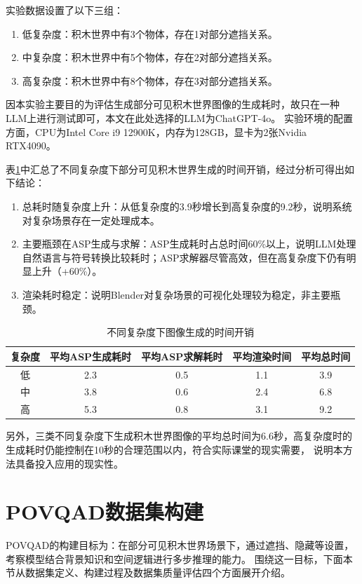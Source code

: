实验数据设置了以下三组：
\begin{enumerate}[nosep]
\item 低复杂度：积木世界中有3个物体，存在1对部分遮挡关系。
\item 中复杂度：积木世界中有5个物体，存在2对部分遮挡关系。
\item 高复杂度：积木世界中有8个物体，存在3对部分遮挡关系。
\end{enumerate}

因本实验主要目的为评估生成部分可见积木世界图像的生成耗时，故只在一种LLM上进行测试即可，本文在此处选择的LLM为ChatGPT-4o。
实验环境的配置方面，CPU为Intel Core i9 12900K，内存为128GB，显卡为2张Nvidia RTX4090。

表\ref{tab:time-for-asp-based-image-generation}中汇总了不同复杂度下部分可见积木世界生成的时间开销，经过分析可得出如下结论：
\begin{enumerate}[nosep]
\item 总耗时随复杂度上升：从低复杂度的3.9秒增长到高复杂度的9.2秒，说明系统对复杂场景存在一定处理成本。
\item 主要瓶颈在ASP生成与求解：ASP生成耗时占总时间60\%以上，说明LLM处理自然语言与符号转换比较耗时；ASP求解器尽管高效，但在高复杂度下仍有明显上升（+60\%）。
\item 渲染耗时稳定：说明Blender对复杂场景的可视化处理较为稳定，非主要瓶颈。
\end{enumerate}
\begin{table}[h]
  \centering
  \begin{tabular}{ccccc}
    \toprule
    \textbf{复杂度} & \textbf{平均ASP生成耗时} & \textbf{平均ASP求解耗时} & \textbf{平均渲染时间} & \textbf{平均总时间} \\ 
    \midrule
    低 & 2.3 & 0.5 & 1.1 & 3.9 \\ 
    \midrule
    中 & 3.8 & 0.6 & 2.4 & 6.8 \\
    \midrule
    高 & 5.3 & 0.8 & 3.1 & 9.2 \\
    \bottomrule
  \end{tabular}
  \caption{不同复杂度下图像生成的时间开销}
  \label{tab:time-for-asp-based-image-generation}
\end{table}

另外，三类不同复杂度下生成积木世界图像的平均总时间为6.6秒，高复杂度时的生成耗时仍能控制在10秒的合理范围以内，符合实际课堂的现实需要，
说明本方法具备投入应用的现实性。
\section{POVQAD数据集构建}
POVQAD的构建目标为：在部分可见积木世界场景下，通过遮挡、隐藏等设置，考察模型结合背景知识和空间逻辑进行多步推理的能力。
围绕这一目标，下面本节从数据集定义、构建过程及数据集质量评估四个方面展开介绍。
